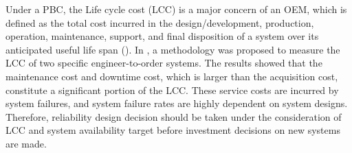 \documentclass[preprint,12pt]{elsarticle}
\begin{document}



Under a PBC, the Life cycle cost (LCC) is a major concern of an OEM, which is defined as the total cost incurred in the design/development, production, operation, maintenance, support, and final disposition of a system over its anticipated useful life span (\citet{Barringer}). In \citet{Oner2007}, a methodology was proposed to measure the LCC of two specific engineer-to-order systems. The results showed that the maintenance cost and downtime cost, which is larger than the acquisition cost, constitute a significant portion of the LCC. These service costs are incurred by system failures, and system failure rates are highly dependent on system designs. Therefore, reliability design decision should be taken under the consideration of LCC and system availability target before investment decisions on new systems are made.
\end{document}
